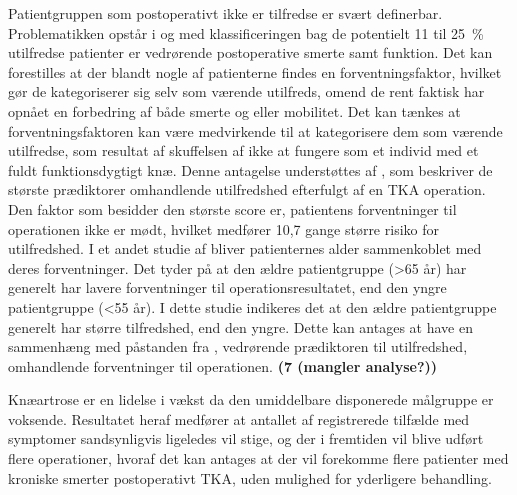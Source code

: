 Patientgruppen som postoperativt ikke er tilfredse er svært definerbar. Problematikken opstår i og med klassificeringen bag de potentielt 11 til 25~\% utilfredse patienter er vedrørende postoperative smerte samt funktion. Det kan forestilles at der blandt nogle af patienterne findes en forventningsfaktor, hvilket gør de kategoriserer sig selv som værende utilfreds, omend de rent faktisk har opnået en forbedring af både smerte og eller mobilitet. Det kan tænkes at forventningsfaktoren kan være medvirkende til at kategorisere dem som værende utilfredse, som resultat af skuffelsen af ikke at fungere som et individ med et fuldt funktionsdygtigt knæ. Denne antagelse understøttes af \cite{Bourne2010}, som beskriver de største prædiktorer omhandlende utilfredshed efterfulgt af en TKA operation. Den faktor som besidder den største score er, patientens forventninger til operationen ikke er mødt, hvilket medfører 10,7 gange større risiko for utilfredshed. \citep{Bourne2010} I et andet studie af \cite{Keudell2013} bliver patienternes alder sammenkoblet med deres forventninger. Det tyder på at den ældre patientgruppe (>65 år) har generelt har lavere forventninger til operationsresultatet, end den yngre patientgruppe (<55 år). I dette studie indikeres det at den ældre patientgruppe generelt har større tilfredshed, end den yngre. Dette kan antages at have en sammenhæng med påstanden fra \cite{Bourne2010}, vedrørende prædiktoren til utilfredshed, omhandlende forventninger til operationen. \textbf{(7 (mangler analyse?))}

Knæartrose er en lidelse i vækst da den umiddelbare disponerede målgruppe er voksende. Resultatet heraf medfører at antallet af registrerede tilfælde med symptomer sandsynligvis ligeledes vil stige, og der i fremtiden vil blive udført flere operationer, hvoraf det kan antages at der vil forekomme flere patienter med kroniske smerter postoperativt TKA, uden mulighed for yderligere behandling.

